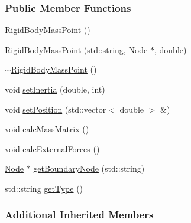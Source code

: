 \subsubsection*{Public Member Functions}
\begin{DoxyCompactItemize}
\item 
\hyperlink{classmknix_1_1_rigid_body_mass_point_abfaacfed0f515ff66207028b558b8fd2}{Rigid\-Body\-Mass\-Point} ()
\item 
\hyperlink{classmknix_1_1_rigid_body_mass_point_a4cd5dda763fcc9f796952f209bd7b2dc}{Rigid\-Body\-Mass\-Point} (std\-::string, \hyperlink{classmknix_1_1_node}{Node} $\ast$, double)
\item 
\hyperlink{classmknix_1_1_rigid_body_mass_point_a005fcbbf85deb13c32e87c9a3ef51844}{$\sim$\-Rigid\-Body\-Mass\-Point} ()
\item 
void \hyperlink{classmknix_1_1_rigid_body_mass_point_a1d06b28d8a37323aba31649518ff4b85}{set\-Inertia} (double, int)
\item 
void \hyperlink{classmknix_1_1_rigid_body_mass_point_a74fcf74f09c6c5abaa0cd0fe7383e2a5}{set\-Position} (std\-::vector$<$ double $>$ \&)
\item 
void \hyperlink{classmknix_1_1_rigid_body_mass_point_aed37447f963c4393b30febe281589b99}{calc\-Mass\-Matrix} ()
\item 
void \hyperlink{classmknix_1_1_rigid_body_mass_point_a281842fc7cf1367bbed4c5e477ac8da9}{calc\-External\-Forces} ()
\item 
\hyperlink{classmknix_1_1_node}{Node} $\ast$ \hyperlink{classmknix_1_1_rigid_body_mass_point_a9b94042419a54e3d75634028dcc27533}{get\-Boundary\-Node} (std\-::string)
\item 
std\-::string \hyperlink{classmknix_1_1_rigid_body_mass_point_aa97f367f1f1701f5d7981c994a96fb5e}{get\-Type} ()
\end{DoxyCompactItemize}
\subsubsection*{Additional Inherited Members}


